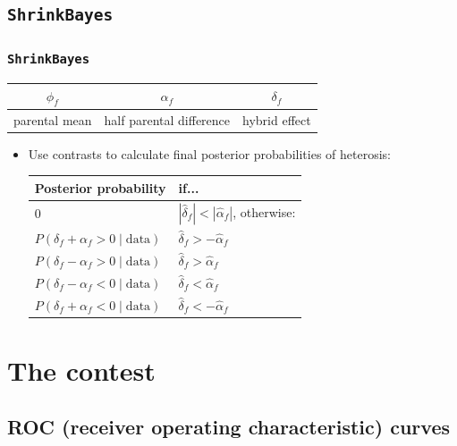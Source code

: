 \documentclass[handout]{beamer}
\providecommand{\wh}[1]{\widehat{#1}}
\numberwithin{equation}{section}
\begin{document}
\subsection{{\tt ShrinkBayes}}

\begin{frame}
\frametitle{{\tt ShrinkBayes}}


\begin{center}
\begin{tabular}{c|c|c}
$\phi_f$ & $\alpha_f$ & $\delta_f$ \\ \hline
parental mean & half parental difference & hybrid effect
\end{tabular}
\end{center}
\normalsize

\begin{itemize}
\item Use contrasts to calculate final posterior probabilities of heterosis:

\begin{center}
\begin{tabular}{l|l}
Posterior probability & if... \\ \hline
0 & $|\wh{\delta}_f| < |\wh{\alpha}_f|$, otherwise: \\
$P(\delta_f + \alpha_f > 0 \mid \text{data})$ & $\wh{\delta}_f > -\wh{\alpha}_f$ \\
$P(\delta_f - \alpha_f > 0 \mid \text{data})$ & $\wh{\delta}_f > \wh{\alpha}_f$ \\
$P(\delta_f - \alpha_f < 0 \mid \text{data})$ & $\wh{\delta}_f < \wh{\alpha}_f$ \\
$P(\delta_f + \alpha_f < 0 \mid \text{data})$ & $\wh{\delta}_f < -\wh{\alpha}_f$ \\
\end{tabular}
\end{center}

\end{itemize}
\end{frame}

\section{The contest}

\subsection{ROC (receiver operating characteristic) curves}
\end{document}

